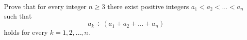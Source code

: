 Prove that for every integer $n\geq 3$ there exist positive integers $a_1<a_2<\ldots<a_n$ such that
$$a_k \div (a_1+a_2+\ldots+a_n)$$
holds for every $k=1,2,\ldots,n$.

